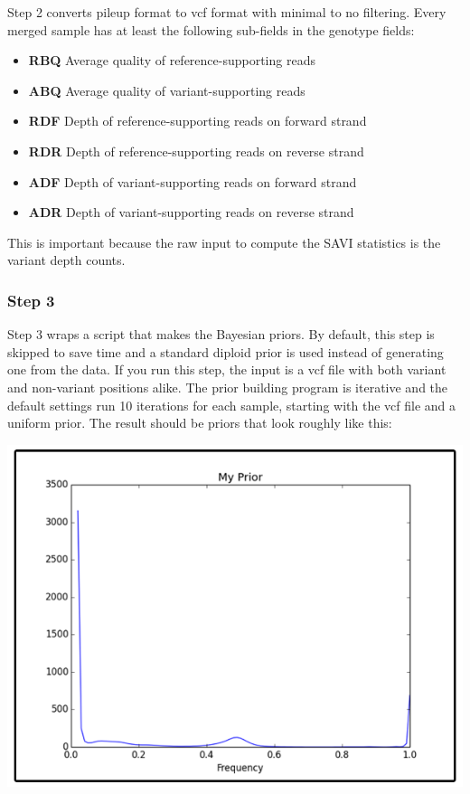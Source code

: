 \documentclass[letterpaper,14pt]{memoir}
\begin{document}
Step 2 converts pileup format to vcf format with minimal to no filtering.
Every merged sample has at least the following sub-fields in the genotype fields:

\begin{itemize}
\tightlist
\item
  \textbf{RBQ} Average quality of reference-supporting reads
\item
  \textbf{ABQ} Average quality of variant-supporting reads
\item
  \textbf{RDF} Depth of reference-supporting reads on forward strand
\item
  \textbf{RDR} Depth of reference-supporting reads on reverse strand
\item
  \textbf{ADF} Depth of variant-supporting reads on forward strand
\item
  \textbf{ADR} Depth of variant-supporting reads on reverse strand
\end{itemize}

\noindent This is important because the raw input to compute the SAVI statistics is the variant depth counts.

\subsubsection{Step 3}

Step 3 wraps a script that makes the Bayesian priors.
By default, this step is skipped to save time and a standard diploid prior is used instead of generating one from the data.
If you run this step, the input is a vcf file with both variant and non-variant positions alike.
The prior building program is iterative and the default settings run 10 iterations for each sample, starting with the vcf file and a uniform prior. 
The result should be priors that look roughly like this: 

\begin{center}
\includegraphics[scale=0.75]{myprior_600.png}
\end{center}
\end{document}
